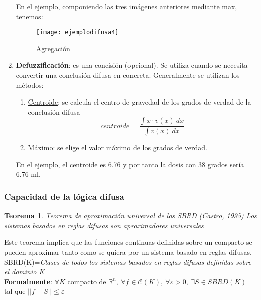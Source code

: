 \documentclass[12pt]{article}
\newtheorem{theorem}{Teorema}
\begin{document}
\begin{enumerate}
En el ejemplo, componiendo las tres imágenes anteriores mediante max, tenemos:
\begin{figure}[H]
\centering
\texttt{[image: ejemplodifusa4]}
\caption{Agregación}
\label{fig:ejemplodifusa4}
\end{figure}

\item \textbf{Defuzzificación}: es una concisión (opcional). Se utiliza cuando se necesita convertir una conclusión difusa en concreta. Generalmente se utilizan los métodos:
\begin{enumerate}
\item \underline{Centroide}: se calcula el centro de gravedad de los grados de verdad de la conclusión difusa
\[ centroide=\frac{\int x \cdot v(x)\ dx}{\int v(x)\ dx} \]
\item \underline{Máximo}: se elige el valor máximo de los grados de verdad.
\end{enumerate}
En el ejemplo, el centroide es 6.76 y por tanto la dosis con 38 grados sería 6.76 ml.
\end{enumerate}

\subsubsection{Capacidad de la lógica difusa}

\begin{theorem}
\emph{Teorema de aproximación universal de los SBRD (Castro, 1995)}
Los sistemas basados en reglas difusas son aproximadores universales
\end{theorem}

Este teorema implica que las funciones continuas definidas sobre un compacto se pueden aproximar tanto como se quiera por un sistema basado en reglas difusas.\\
SBRD(K)=\textit{Clases de todos los sistemas basados en reglas difusas definidas sobre el dominio K}\\
\textbf{Formalmente}: $\forall K$ compacto de $\mathbb{R}^n,\ \forall f \in \mathcal{C}(K),\ \forall \varepsilon > 0,\ \exists S \in SBRD(K)$ tal que $||f-S|| \leq \varepsilon$
\end{document}
